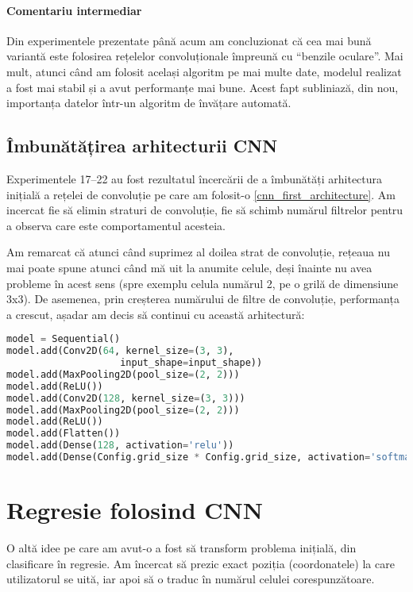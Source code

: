 
\paragraph{Comentariu intermediar}
Din experimentele prezentate până acum am concluzionat că cea mai bună variantă este folosirea rețelelor convoluționale împreună cu ``benzile oculare''.
Mai mult, atunci când am folosit același algoritm pe mai multe date, modelul realizat a fost mai stabil și a avut performanțe mai bune.
Acest fapt subliniază, din nou, importanța datelor într-un algoritm de învățare automată.

\subsection{Îmbunătățirea arhitecturii CNN}
Experimentele 17–22 au fost rezultatul încercării de a îmbunătăți arhitectura inițială a rețelei de convoluție pe care am folosit-o \ref{cnn_first_architecture}.
Am incercat fie să elimin straturi de convoluție, fie să schimb numărul filtrelor pentru a observa care este comportamentul acesteia.

Am remarcat că atunci când suprimez al doilea strat de convoluție, rețeaua nu mai poate spune atunci când mă uit la anumite celule, deși înainte nu avea probleme în acest sens (spre exemplu celula numărul 2, pe o grilă de dimensiune 3x3).
De asemenea, prin creșterea numărului de filtre de convoluție, performanța a crescut, așadar am decis să continui cu această arhitectură:

\begin{lstlisting}[language=Python, caption=Arhitectura CNN îmbunătățită]
model = Sequential()
model.add(Conv2D(64, kernel_size=(3, 3),
                    input_shape=input_shape))
model.add(MaxPooling2D(pool_size=(2, 2)))
model.add(ReLU())
model.add(Conv2D(128, kernel_size=(3, 3)))
model.add(MaxPooling2D(pool_size=(2, 2)))
model.add(ReLU())
model.add(Flatten())
model.add(Dense(128, activation='relu'))
model.add(Dense(Config.grid_size * Config.grid_size, activation='softmax'))
\end{lstlisting}

\section{Regresie folosind CNN}
O altă idee pe care am avut-o a fost să transform problema inițială, din clasificare în regresie.
Am încercat să prezic exact poziția (coordonatele) la care utilizatorul se uită, iar apoi să o traduc în numărul celulei corespunzătoare.

